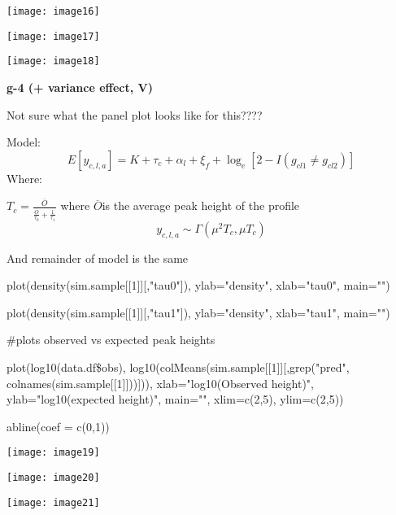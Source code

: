 \documentclass{article} %
\begin{document}
\noindent 

\noindent 

\noindent \texttt{[image: image16]}

\noindent 

\noindent \texttt{[image: image17]}

\noindent 

\noindent \texttt{[image: image18]}

\noindent 

\noindent \eject 

\noindent \textbf{g-4 (+ variance effect, V)}

\noindent 

\noindent Not sure what the panel plot looks like for this????

\noindent 

\noindent Model:
\[E\left[y_{c,l,a} \right]=K+\tau _{c} +\alpha _{l} +\xi _{f} +\log _{e} \left[2-I\left(g_{cl1} \ne g_{cl2} \right)\right]\] 
Where:

\noindent $T_{c} =\frac{\overline{O}}{\frac{\overline{O}}{\tau _{0} } +\frac{1}{\tau _{1} } } $  where $\overline{O}$is the average peak height of the profile
\[y_{c,l,a} \sim \Gamma \left(\mu ^{2} T_{c} ,\mu T_{c} \right)\] 


\noindent And remainder of model is the same

\noindent 

\noindent plot(density(sim.sample[[1]][,"tau0"]), ylab="density", xlab="tau0", main="")

\noindent plot(density(sim.sample[[1]][,"tau1"]), ylab="density", xlab="tau1", main="")

\noindent 

\noindent \#plots observed vs expected peak heights

\noindent plot(log10(data.df\$obs), log10(colMeans(sim.sample[[1]][,grep("pred", colnames(sim.sample[[1]]))])), xlab="log10(Observed height)", ylab="log10(expected height)", main="", xlim=c(2,5), ylim=c(2,5))

\noindent abline(coef = c(0,1))

\noindent 

\noindent \texttt{[image: image19]}

\noindent 

\noindent \texttt{[image: image20]}

\noindent \texttt{[image: image21]}

\noindent 

\noindent 
\end{document}
